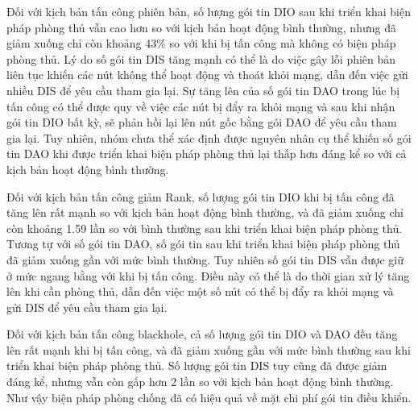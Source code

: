 Đối với kịch bản tấn công phiên bản, số lượng gói tin DIO sau khi triển khai biện pháp phòng thủ vẫn cao hơn so với kịch bản hoạt động bình thường, nhưng đã giảm xuống chỉ còn khoảng 43\% so với khi bị tấn công mà không có biện pháp phòng thủ. Lý do số gói tin DIS tăng mạnh có thể là do việc gây lỗi phiên bản liên tục khiến các nút không thể hoạt động và thoát khỏi mạng, dẫn đến việc gửi nhiều DIS để yêu cầu tham gia lại. Sự tăng lên của số gói tin DAO trong lúc bị tấn công có thể được quy về việc các nút bị đẩy ra khỏi mạng và sau khi nhận gói tin DIO bất kỳ, sẽ phản hồi lại lên nút gốc bằng gói DAO để yêu cầu tham gia lại. Tuy nhiên, nhóm chưa thể xác định được nguyên nhân cụ thể khiến số gói tin DAO khi được triển khai biện pháp phòng thủ lại thấp hơn đáng kể so với cả kịch bản hoạt động bình thường.

Đối với kịch bản tấn công giảm Rank, số lượng gói tin DIO khi bị tấn công đã tăng lên rất mạnh so với kịch bản hoạt động bình thường, và đã giảm xuống chỉ còn khoảng 1.59 lần so với bình thường sau khi triển khai biện pháp phòng thủ. Tương tự với số gói tin DAO, số gói tin sau khi triển khai biện pháp phòng thủ đã giảm xuống gần với mức bình thường. Tuy nhiên số gói tin DIS vẫn được giữ ở mức ngang bằng với khi bị tấn công. Điều này có thể là do thời gian xử lý tăng lên khi cần phòng thủ, dẫn đến việc một số nút có thể bị đẩy ra khỏi mạng và gửi DIS để yêu cầu tham gia lại.

Đối với kịch bản tấn công blackhole, cả số lượng gói tin DIO và DAO đều tăng lên rất mạnh khi bị tấn công, và đã giảm xuống gần với mức bình thường sau khi triển khai biện pháp phòng thủ. Số lượng gói tin DIS tuy cũng đã được giảm đáng kể, nhưng vẫn còn gấp hơn 2 lần so với kịch bản hoạt động bình thường. Như vậy biện pháp phòng chống đã có hiệu quả về mặt chi phí gói tin điều khiển.


\begin{table}[ht]
\centering
{}
\caption{Tổng số gói tin (DIO / DIS / DAO) theo kịch bản}
\label{table:overheads}
\end{table}

